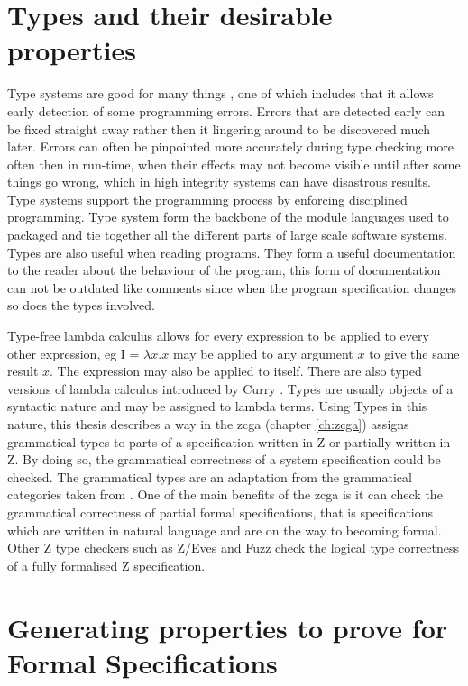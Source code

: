 \section{Types and their desirable properties}

Type systems are good for many things \cite{pierce}, one of which includes that it allows early detection of some programming errors. Errors that are detected early can be fixed straight away rather then it lingering around to be discovered much later. Errors can often be pinpointed more accurately during type checking more often then in run-time, when their effects may not become visible until after some things go wrong, which in high integrity systems can have disastrous results. Type systems support the programming process by enforcing disciplined programming. Type system form the backbone of the module languages used to packaged and tie together all the different parts of large scale software systems. Types are also useful when reading programs. They form a useful documentation to the reader about the behaviour of the program, this form of documentation can not be outdated like comments since when the program specification changes so does the types involved.

Type-free lambda calculus \cite{bar93} allows for every expression to be applied to every other expression, eg I = $\lambda x.x$ may be applied to any argument $x$ to give the same result $x$. The expression may also be applied to itself. There are also typed versions of lambda calculus introduced by Curry \cite{cu34}. Types are usually objects of a syntactic nature and may be assigned to lambda terms. Using Types in this nature, this thesis describes a way in the \gls{zcga} (chapter \ref{ch:zcga}) assigns grammatical types to parts of a specification written in Z or partially written in Z. By doing so, the grammatical correctness of a system specification could be checked. The grammatical types are an adaptation from the grammatical categories taken from \cite{wtt}. One of the main benefits of the \gls{zcga} is it can check the grammatical correctness of partial formal specifications, that is specifications which are written in natural language and are on the way to becoming formal. Other Z type checkers such as Z/Eves \cite{Saaltink99thez/eves} and Fuzz \cite{spiveyfuzz} check the logical type correctness of a fully formalised Z specification.

\section{Generating properties to prove for Formal Specifications}
\label{sec:generatingpropforformal}

